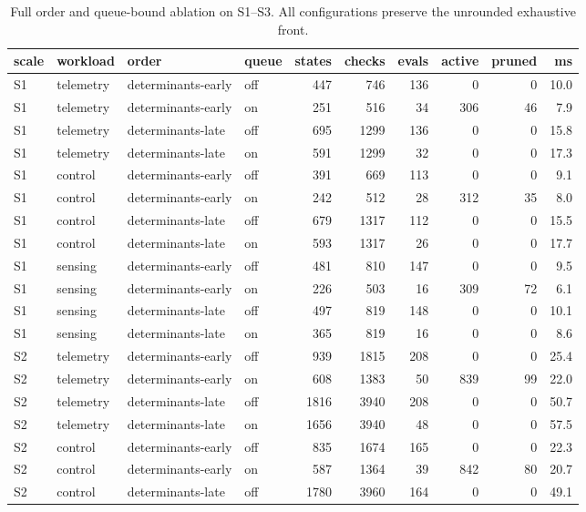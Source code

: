 \documentclass[pdflatex,sn-nature]{sn-jnl}
\theoremstyle{thmstyleone}
\theoremstyle{thmstyletwo}
\theoremstyle{thmstylethree}
\begin{document}
\begin{table}[!htbp]\centering
\caption{Full order and queue-bound ablation on S1--S3. All configurations preserve the
unrounded exhaustive front.}\label{tabS7}
{\let\scriptsize\tiny\setlength{\tabcolsep}{2pt}\scriptsize
\begin{tabular}{llllrrrrrr}
\toprule
scale & workload & order & queue & states & checks & evals & active & pruned & ms \\
\midrule
S1 & telemetry & determinants-early & off & 447 & 746 & 136 & 0 & 0 & 10.0 \\
S1 & telemetry & determinants-early & on & 251 & 516 & 34 & 306 & 46 & 7.9 \\
S1 & telemetry & determinants-late & off & 695 & 1299 & 136 & 0 & 0 & 15.8 \\
S1 & telemetry & determinants-late & on & 591 & 1299 & 32 & 0 & 0 & 17.3 \\
S1 & control & determinants-early & off & 391 & 669 & 113 & 0 & 0 & 9.1 \\
S1 & control & determinants-early & on & 242 & 512 & 28 & 312 & 35 & 8.0 \\
S1 & control & determinants-late & off & 679 & 1317 & 112 & 0 & 0 & 15.5 \\
S1 & control & determinants-late & on & 593 & 1317 & 26 & 0 & 0 & 17.7 \\
S1 & sensing & determinants-early & off & 481 & 810 & 147 & 0 & 0 & 9.5 \\
S1 & sensing & determinants-early & on & 226 & 503 & 16 & 309 & 72 & 6.1 \\
S1 & sensing & determinants-late & off & 497 & 819 & 148 & 0 & 0 & 10.1 \\
S1 & sensing & determinants-late & on & 365 & 819 & 16 & 0 & 0 & 8.6 \\
S2 & telemetry & determinants-early & off & 939 & 1815 & 208 & 0 & 0 & 25.4 \\
S2 & telemetry & determinants-early & on & 608 & 1383 & 50 & 839 & 99 & 22.0 \\
S2 & telemetry & determinants-late & off & 1816 & 3940 & 208 & 0 & 0 & 50.7 \\
S2 & telemetry & determinants-late & on & 1656 & 3940 & 48 & 0 & 0 & 57.5 \\
S2 & control & determinants-early & off & 835 & 1674 & 165 & 0 & 0 & 22.3 \\
S2 & control & determinants-early & on & 587 & 1364 & 39 & 842 & 80 & 20.7 \\
S2 & control & determinants-late & off & 1780 & 3960 & 164 & 0 & 0 & 49.1 \\

\end{tabular}}
\end{table}
\end{document}
